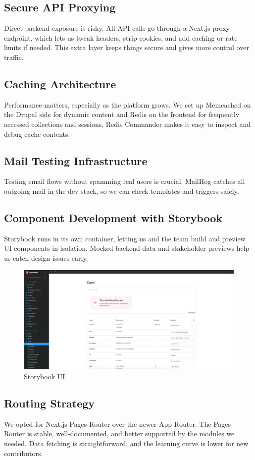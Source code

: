 \subsection{Secure API Proxying}

Direct backend exposure is risky. All API calls go through a Next.js proxy endpoint, which lets us tweak headers, strip cookies, and add caching or rate limits if needed. This extra layer keeps things secure and gives more control over traffic.

\subsection{Caching Architecture}

Performance matters, especially as the platform grows. We set up Memcached on the Drupal side for dynamic content and Redis on the frontend for frequently accessed collections and sessions. Redis Commander makes it easy to inspect and debug cache contents.

\subsection{Mail Testing Infrastructure}

Testing email flows without spamming real users is crucial. MailHog catches all outgoing mail in the dev stack, so we can check templates and triggers safely.

\subsection{Component Development with Storybook}

Storybook runs in its own container, letting us and the team build and preview UI components in isolation. Mocked backend data and stakeholder previews help us catch design issues early.
\begin{figure}[H]
  \centering
  \includegraphics[width=\textwidth]{images/storybook.png}
  \caption{Storybook UI}
  \label{fig:storybook}
\end{figure}


\subsection{Routing Strategy}

We opted for Next.js Pages Router over the newer App Router. The Pages Router is stable, well-documented, and better supported by the modules we needed. Data fetching is straightforward, and the learning curve is lower for new contributors.

